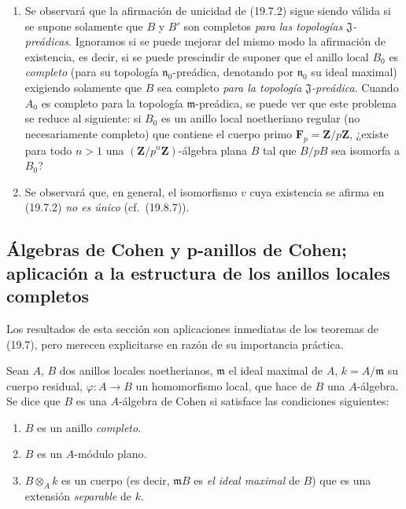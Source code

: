 \begin{remarks}[19.7.3]
\label{0.19.7.3-fr}
\begin{enumerate}
  \item[(i)] Se observará que la afirmación de unicidad de (19.7.2) sigue siendo
  válida si se supone solamente que $B$ y $B'$ son completos \emph{para
  las topologías $\mathfrak J$-preádicas}. Ignoramos si se puede
  mejorar del mismo modo la afirmación de existencia, es decir, si se puede
  prescindir de suponer que el anillo local $B_0$ es \emph{completo} (para su topología
  $\mathfrak n_0$-preádica, denotando por $\mathfrak n_0$ su ideal
  maximal) exigiendo solamente que $B$ sea completo \emph{para la topología
  $\mathfrak J$-preádica}. Cuando $A_0$ es completo para la topología
  $\mathfrak m$-preádica, se puede ver que este problema se reduce al siguiente:
  si $B_0$ es un anillo local noetheriano regular (no necesariamente
  completo) que contiene el cuerpo primo $\mathbf F_p=\mathbf Z/p\mathbf Z$,
  ¿existe para todo $n>1$ una $(\mathbf Z/p^n\mathbf Z)$-álgebra plana $B$
  tal que $B/pB$ sea isomorfa a $B_0$?
  \item[(ii)] Se observará que, en general, el isomorfismo $v$ cuya existencia se
  afirma en (19.7.2) \emph{no es único} (cf.~(19.8.7)).
\end{enumerate}
\end{remarks}

\subsection{Álgebras de Cohen y p-anillos de Cohen; aplicación a la
estructura de los anillos locales completos}
\label{subsection:0.19.8-fr}

Los resultados de esta sección son aplicaciones inmediatas de los teoremas
de (19.7), pero merecen explicitarse en razón de su importancia
práctica.

\begin{definition}[19.8.1]
\label{0.19.8.1-fr}
Sean $A$, $B$ dos anillos locales noetherianos, $\mathfrak m$ el ideal maximal
de $A$, $k=A/\mathfrak m$ su cuerpo residual,
$\varphi:A\to B$ un homomorfismo local, que hace de $B$ una $A$-álgebra. Se
dice que $B$ es una $A$-álgebra de Cohen si satisface las condiciones
siguientes:
\begin{enumerate}
  \item[(i)] $B$ es un anillo \emph{completo}.
  \item[(ii)] $B$ es un $A$-módulo plano.
  \item[(iii)] $B\otimes_A k$ es un cuerpo \textup{(es decir,
  $\mathfrak mB$ es \emph{el ideal maximal} de $B$)} que es una extensión
  \emph{separable} de $k$.
\end{enumerate}
\end{definition}

